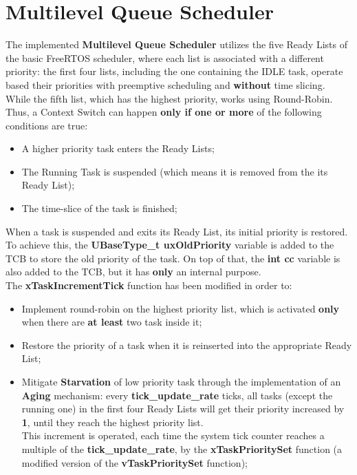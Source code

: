 \documentclass{article}
\begin{document}
\section{Multilevel Queue Scheduler}
The implemented \textbf{Multilevel Queue Scheduler} utilizes the five Ready Lists of the basic FreeRTOS scheduler, where each list is associated with a different priority: the first four lists, including the one containing the IDLE task, operate based their priorities with preemptive scheduling and \textbf{without} time slicing. While the fifth list, which has the highest priority, works using Round-Robin.\\[0.1cm]
Thus, a Context Switch can happen \textbf{only if one or more} of the following conditions are true:
\begin{itemize}
    \item A higher priority task enters the Ready Lists;
    \item The Running Task is suspended (which means it is removed from the its Ready List);
    \item The time-slice of the task is finished;
\end{itemize}
When a task is suspended and exits its Ready List, its initial priority is restored. To achieve this, the \textbf{UBaseType\_t uxOldPriority} variable is added to the TCB to store the old priority of the task. On top of that, the \textbf{int cc} variable is also added to the TCB, but it has \textbf{only} an internal purpose.\\[0.1cm]
The \textbf{xTaskIncrementTick} function has been modified in order to:
\begin{itemize}
    \item Implement round-robin on the highest priority list, which is activated \textbf{only} when there are \textbf{at least} two task inside it;

    \item Restore the priority of a task when it is reinserted into the appropriate Ready List;

    \item Mitigate \textbf{Starvation} of low priority task through the implementation of an \textbf{Aging} mechanism: every \textbf{tick\_update\_rate} ticks, all tasks (except the running one) in the first four Ready Lists will get their priority increased by \textbf{1}, until they reach the highest priority list.\\[0.1cm]
    This increment is operated, each time the system tick counter reaches a multiple of the \textbf{tick\_update\_rate}, by the \textbf{xTaskPrioritySet} function (a modified version of the \textbf{vTaskPrioritySet} function);
\end{itemize}  
\end{document}
